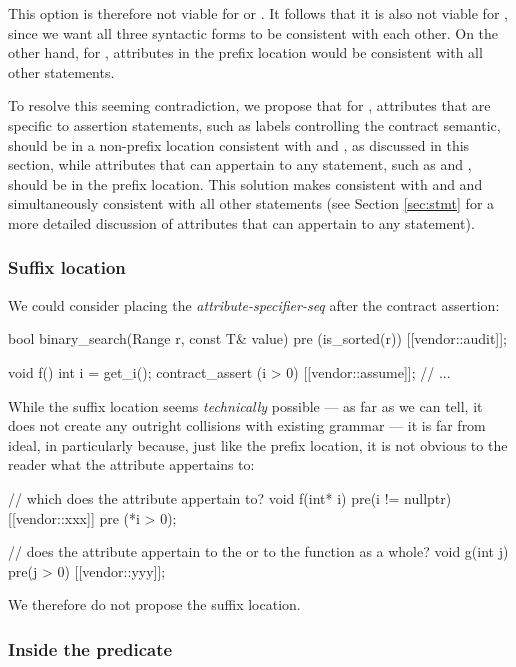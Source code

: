 This option is therefore not viable for  or . It follows that it is also not viable for , since we want all three syntactic forms to be consistent with each other. On the other hand, for , attributes in the prefix location would be consistent with all other statements.

To resolve this seeming contradiction, we propose that for , attributes that are specific to assertion statements, such as labels controlling the contract semantic, should be in a non-prefix location consistent with  and , as discussed in this section, while attributes that can appertain to any statement, such as \tcode{[[likely]]} and \tcode{[[unlikely]]}, should be in the prefix location. This solution makes  consistent with  and  and simultaneously consistent with all other statements (see Section \ref{sec:stmt} for a more detailed discussion of attributes that can appertain to any statement).

\subsubsection{Suffix location}
We could consider placing the \emph{attribute-specifier-seq} after the contract assertion:
\begin{codeblock}
bool binary_search(Range r, const T& value)
  pre (is_sorted(r)) [[vendor::audit]];
  
void f() {
  int i = get_i();
  contract_assert (i > 0) [[vendor::assume]];
  // ...
}
\end{codeblock}
While the suffix location seems \emph{technically} possible --- as far as we can tell, it does not create any outright collisions with existing grammar --- it is far from ideal, in particularly because, just like the prefix location, it is not obvious to the reader what the attribute appertains to:
\begin{codeblock}
// which  does the attribute appertain to?
void f(int* i)
  pre(i != nullptr) [[vendor::xxx]] pre (*i > 0);  

// does the attribute appertain to the  or to the function  as a whole?
void g(int j) pre(j > 0) [[vendor::yyy]]; 
\end{codeblock}

We therefore do not propose the suffix location.

\subsubsection{Inside the predicate}

